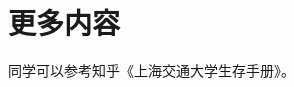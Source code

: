\documentclass{article}
\begin{document}
\section{更多内容}
同学可以参考知乎《上海交通大学生存手册》。






 

\end{document}
